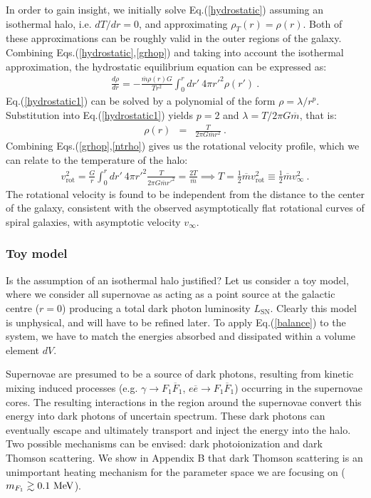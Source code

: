 \documentclass[12pt]{article}
\begin{document}
{{In order to gain insight, we initially solve Eq.(\ref{hydrostatic}) assuming an isothermal halo, i.e. $dT/dr = 0$, and approximating $\rho _T (r) = \rho (r)$. Both of these approximations can be roughly valid in the outer regions of the galaxy. Combining Eqs.(\ref{hydrostatic},\ref{grhop}) and taking into account the isothermal approximation, the hydrostatic equilibrium equation can be expressed as:
%
\begin{eqnarray}
\frac{d\rho}{dr} = -\frac{\overline{m}\rho (r) G}{T r ^2}\int _0 ^r dr' \ 4\pi {r'} ^2 \rho (r') \ .
\label{hydrostatic1}
\end{eqnarray}
%
Eq.(\ref{hydrostatic1}) can be solved by a polynomial of the form $\rho = \lambda/r ^p$. Substitution into Eq.(\ref{hydrostatic1}) yields $p = 2$ and $\lambda = T/2\pi G\overline{m}$, that is:
%
\begin{eqnarray}
\rho (r) &=& \frac{T}{2\pi G\overline{m}r ^2} \ .
\label{ntrho}
\end{eqnarray}
%
Combining Eqs.(\ref{grhop},\ref{ntrho}) gives us the rotational velocity profile, which we can relate to the temperature of the halo:
%
\begin{eqnarray}
v _{\text{rot}} ^2 = \frac{G}{r}\int _0 ^r dr' \ 4\pi {r'} ^2\frac{T}{2\pi G\overline{m}{r'} ^2} = \frac{2T}{\overline{m}} \implies T = \frac{1}{2}\overline{m}v _{\text{rot}} ^2 \equiv \frac{1}{2}\overline{m}v _{\infty} ^2 \ .
\label{vrot}
\end{eqnarray}
%
The rotational velocity is found to be independent from the distance to the center of the galaxy, consistent with the observed asymptotically flat rotational curves of spiral galaxies, with asymptotic velocity $v _{\infty}$.

\subsubsection{Toy model}

Is the assumption of an isothermal halo justified? Let us consider a toy model, where we consider all supernovae as acting as a point source at the galactic centre ($r = 0$) producing a total dark photon luminosity $L _{\text{SN}}$. Clearly this model is unphysical, and will have to be refined later. To apply Eq.(\ref{balance}) to the system, we have to match the energies absorbed and dissipated within a volume element $dV$.

Supernovae are presumed to be a source of dark photons, resulting from kinetic mixing induced processes (e.g. $\gamma \rightarrow F_1\overline{F}_1$, $e\overline{e} \rightarrow F_1\overline{F}_1$) occurring in the supernovae cores. The resulting interactions in the region around the supernovae convert this energy into dark photons of uncertain spectrum. These dark photons can eventually escape and ultimately transport and inject the energy into the halo. Two possible mechanisms can be envised: dark photoionization and dark Thomson scattering. We show in Appendix B that dark Thomson scattering is an unimportant heating mechanism for the parameter space we are focusing on ($m _{F_1} \gtrsim 0.1 \ \rm MeV$).

}}
\end{document}
